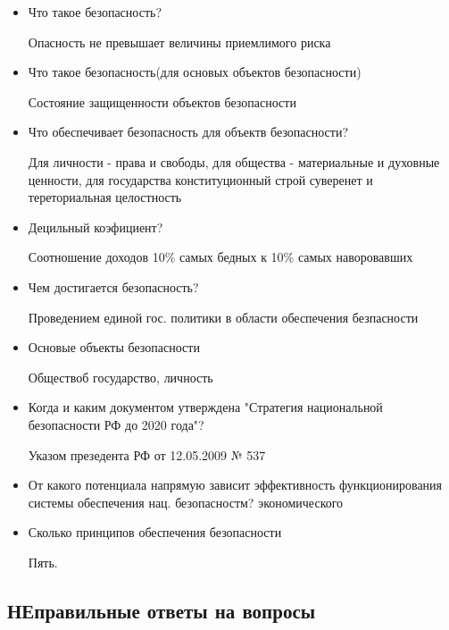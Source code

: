 \documentclass[oneside,final,14pt]{extreport}
\begin{document}
\begin{itemize}
	\item Что такое безопасность?
	
	Опасность не превышает величины приемлимого риска
	
	\item Что такое безопасность(для основых  объектов безопасности)
	
	Состояние защищенности объектов безопасности
	
	\item Что обеспечивает безопасность для объектв безопасности?
	
	Для личности - права и свободы, для общества - материальные и духовные ценности, для государства конституционный строй суверенет  и тереториальная целостность
	
	\item Децильный коэфициент?
	
	Соотношение доходов 10\% самых бедных к 10\% самых наворовавших
	
	\item Чем достигается безопасность?
	
	Проведением единой гос. политики в области обеспечения  безпасности
	
	\item Основые объекты безопасности
	
	Обществоб государство,  личность
	
	\item Когда и каким документом утверждена "Стратегия национальной безопасности РФ до 2020 года"?
	
	Указом презедента РФ от 12.05.2009 № 537
	
	\item От какого потенциала напрямую зависит эффективность функционирования системы обеспечения нац. безопасностм?
	экономического
	
	
	  \item Сколько принципов обеспечения безопасности
	  
	  Пять.
	  
	
	
\end{itemize}




\subsection*{НЕправильные ответы на вопросы}
\end{document}
